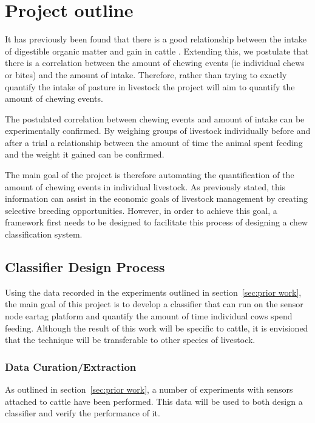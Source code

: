 \chapter{Project outline}
It has previously been found that there is a good relationship between the intake of digestible organic matter and gain in cattle \cite{Lippke1980}. Extending this, we postulate that there is a correlation between the amount of chewing events (ie individual chews or bites) and the amount of intake. Therefore, rather than trying to exactly quantify the intake of pasture in livestock the project will aim to quantify the amount of chewing events. 

The postulated correlation between chewing events and amount of intake can be experimentally confirmed. By weighing groups of livestock individually before and after a trial a relationship between the amount of time the animal spent feeding and the weight it gained can be confirmed. 

The main goal of the project is therefore automating the quantification of the amount of chewing events in individual livestock. As previously stated, this information can assist in the economic goals of livestock management by creating selective breeding opportunities. However, in order to achieve this goal, a framework first needs to be designed to facilitate this process of designing a chew classification system.  

\newpage

\section{Classifier Design Process}

Using the data recorded in the experiments outlined in section~\ref{sec:prior work}, the main goal of this project is to develop a classifier that can run on the sensor node eartag platform and quantify the amount of time individual cows spend feeding. Although the result of this work will be specific to cattle, it is envisioned that the technique will be transferable to other species of livestock. 

\subsection*{Data Curation/Extraction}
As outlined in  section~\ref{sec:prior work}, a number of experiments with sensors attached to cattle have been performed. This data will be used to both design a classifier and verify the performance of it. 

